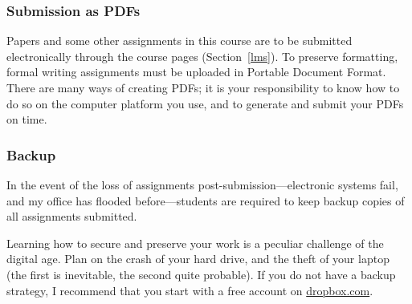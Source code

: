 \subsubsection{Submission as PDFs}
\label{submission}

Papers and some other assignments in this course are to be submitted
electronically through the course pages (Section~\ref{lms}). To preserve
formatting, formal writing assignments must be uploaded in Portable Document
Format. There are many ways of creating PDFs; it is your responsibility to
know how to do so on the computer platform you use, and to generate and submit
your PDFs on time.

\subsubsection{Backup}
\label{backup}

In the event of the loss of assignments post-submission---electronic systems
fail, and my office has flooded before---students are required to keep backup
copies of all assignments submitted.

Learning how to secure and preserve your work is a peculiar challenge of the
digital age. Plan on the crash of your hard drive, and the theft of your
laptop (the first is inevitable, the second quite probable). If you do not
have a backup strategy, I recommend that you start with a free account on
\href{http://db.tt/U7eP1vs}{dropbox.com}.
